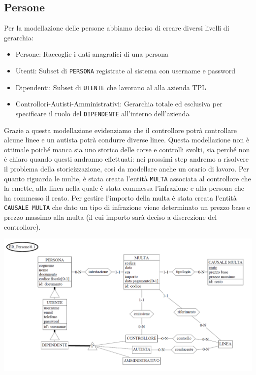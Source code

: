 \documentclass[12pt,a4paper]{report}
\begin{document}
\subsection{Persone}
Per la modellazione delle persone abbiamo deciso di creare diversi livelli di gerarchia:
\begin{itemize}
  \item Persone: Raccoglie i dati anagrafici di una persona
  \item Utenti: Subset di \texttt{PERSONA} registrate al sistema con username e password
  \item Dipendenti: Subset di \texttt{UTENTE} che lavorano al alla azienda TPL
  \item Controllori-Autisti-Amministrativi: Gerarchia totale ed esclusiva per specificare il ruolo del \texttt{DIPENDENTE} all'interno dell'azienda
\end{itemize}
Grazie a questa modellazione evidenziamo che il controllore potrà controllare alcune linee e un autista potrà condurre diverse linee. Questa modellazione non è ottimale poiché manca sia uno storico delle corse e controlli svolti, sia perché non è chiaro quando questi andranno effettuati: nei prossimi step andremo a risolvere il problema della storicizzazione, così da modellare anche un orario di lavoro.
Per quanto riguarda le multe, è stata creata l'entità \texttt{MULTA} associata al controllore che la emette, alla linea nella quale è stata commessa l'infrazione e alla persona che ha commesso il reato. Per gestire l'importo della multa è stata creata l'entità \texttt{CAUSALE MULTA} che dato un tipo di infrazione viene determinato un prezzo base e prezzo massimo alla multa (il cui importo sarà deciso a discrezione del controllore). \\
\begin{centering}
\includegraphics[width=1.0\textwidth]{prog_conc/Persone}
\end{centering}
\end{document}
